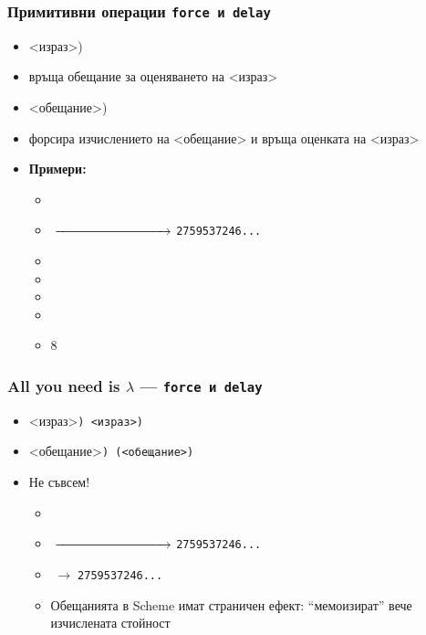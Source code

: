 \documentclass[alsotrans]{beamerswitch}
\begin{document}
\begin{frame}
  \frametitle{Примитивни операции \tt{force} и \tt{delay}}

  \begin{itemize}[<+->]
  \item {} <израз>\tta)
  \item връща \alert{обещание} за оценяването на <израз> 
  \item {} <обещание>\tta)
  \item форсира изчислението на <обещание> и връща оценката на <израз> 
    \pause
  \item \textbf{Примери:}
    \begin{itemize}
    \item {}
    \item {}$\;\xrightarrow{\hspace*{3cm}}\;$\tt{2759537246...}
    \item {}
    \item {}
    \item {}
    \item {}
    \item {}8
    \end{itemize}
  \end{itemize}
\end{frame}

\begin{frame}[fragile]
  \frametitle{All you need is $\lambda$ --- \tt{force} и \tt{delay}}

  \begin{itemize}
  \item {}<израз>\tt) \eqv {}<израз>\tt)
  \item {}<обещание>\tt) \eqv \tt(<обещание>\tt)\pause
  \item \alert{Не съвсем!} \pause
    \begin{itemize}[<.->]
    \item {}
    \item {}$\;\xrightarrow{\hspace*{3cm}}\;$\tt{2759537246...}
    \item {}$\;\rightarrow\;$\tt{2759537246...} \pause
    \item Обещанията в Scheme имат страничен ефект: ``мемоизират'' вече изчислената стойност
    \end{itemize}
  \end{itemize}
\end{frame}
\end{document}
